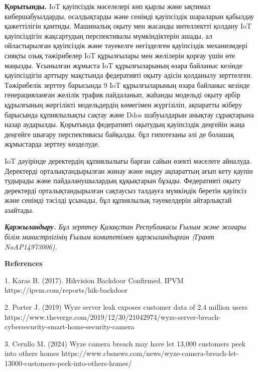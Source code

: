 {\bfseries Қорытынды.} IoT қауіпсіздік мәселелері көп қырлы және ықтимал
кибершабуылдарды, осалдықтарды және сенімді қауіпсіздік шараларын
қабылдау қажеттілігін
қамтиды.\hspace{0pt}\hspace{0pt}\hspace{0pt}\hspace{0pt}\hspace{0pt}\hspace{0pt}\hspace{0pt}
Машиналық оқыту мен жасанды интеллектті қолдану IoT қауіпсіздігін
жақсартудың перспективалы мүмкіндіктерін ашады, ал ойластырылған
қауіпсіздік және тәуекелге негізделген қауіпсіздік механизмдері сияқты
озық тәжірибелер IoT құрылғылары мен желілерін қорғау үшін өте маңызды.
Ұсынылған жұмыста IoT құрылғыларының өзара байланыс кезінде
қауіпсіздігін арттыру мақстында федеративті оқыту әдісін қолданылу
зерттелген. Тәжірибелік зерттеу барысында 9 IoT құрылғыларының өзара
байланыс кезінде генерацияланған желілік трафик пайдаланып, жаһанды
модельді оқыту әрбір құрылғының жергілікті модельдердің көмегімен
жүргізіліп, ақпаратты жіберу барысында құпиялылықты сақтау және Ddos
шабуылдарын анықтау сұрақтарына назар аударылды. Қорытында федеративті
оқытудың қауіпсіздік деңгейін жаңа деңгейге шығару перспективасы
байқалды. бұл гипотезаны әлі де болашақ жұмыстарда зерттеу көзделуде.

IoT дәуірінде деректердің құпиялылығы барған сайын өзекті мәселеге
айналуда. Деректерді орталықтандырылған жинау және өңдеу ақпараттың ағып
кету қаупін тудырады және пайдаланушылардың құқықтарын бұзады.
Федеративті оқыту деректерді орталықтандырылған сақтаусыз талдауға
мүмкіндік беретін қауіпсіз және сенімді тәсілді ұсынады, бұл құпиялылық
тәуекелдерін айтарлықтай азайтады.

\emph{{\bfseries Қаржыландыру.} Бұл зерттеу Қазақстан Республикасы Ғылым
және жоғары білім министрлігінің Ғылым комитетімен қаржыландырған (Грант
NoAP14973006).}

{\bfseries References}

1. Karas B. (2017). Hikvision Backdoor Confirmed. IPVM
https://ipvm.com/reports/hik-backdoor

2. Porter J. (2019) Wyze server leak exposes customer data of 2.4
million users
https://www.theverge.com/2019/12/30/21042974/wyze-server-breach-cybersecurity-smart-home-security-camera

3. Cerullo M. (2024) Wyze camera breach may have let 13,000 customers
peek into others\textquotesingle{} homes
https://www.cbsnews.com/news/wyze-camera-breach-let-13000-customers-peek-into-others-homes/

